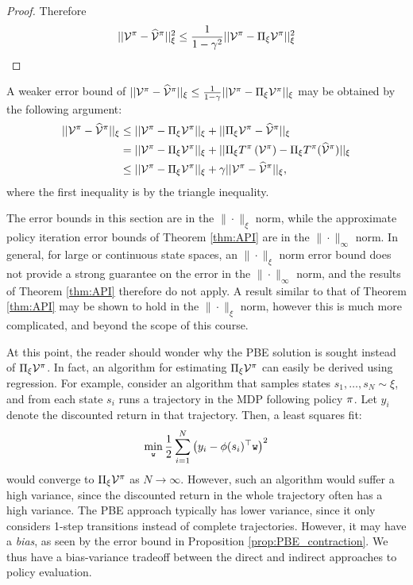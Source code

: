 \begin{proof}
Therefore
$$||\mathcal{V}^\pi - \widehat{\mathcal{V}}^{\pi}||_\xi^2 \le \frac{1}{1-\gamma^2}||\mathcal{V}^\pi-\Pi_\xi \mathcal{V}^\pi||_\xi^2$$
\end{proof}

\begin{remark}
A weaker error bound of $||\mathcal{V}^\pi - \widehat{\mathcal{V}}^{\pi}||_\xi \le \frac{1}{1-\gamma}||\mathcal{V}^\pi-\Pi_\xi
\mathcal{V}^\pi||_\xi$ may be obtained by the following argument:
\begin{equation}
\begin{split}||\mathcal{V}^{\pi}-\widehat{\mathcal{V}}^{\pi}||_{\xi} & \leq||\mathcal{V}^{\pi}-\Pi_{\xi}\mathcal{V}^{\pi}||_{\xi}+||\Pi_{\xi}\mathcal{V}^{\pi}-\widehat{\mathcal{V}}^{\pi}||_{\xi}\\
 & =||\mathcal{V}^{\pi}-\Pi_{\xi}\mathcal{V}^{\pi}||_{\xi}+||\Pi_{\xi}T^{\pi}\left(\mathcal{V}^{\pi}\right)-\Pi_{\xi}T^{\pi}(\widehat{\mathcal{V}}^{\pi})||_{\xi}\\
 & \leq||\mathcal{V}^{\pi}-\Pi_{\xi}\mathcal{V}^{\pi}||_{\xi}+\gamma||\mathcal{V}^{\pi}-\widehat{\mathcal{V}}^{\pi}||_{\xi},
\end{split}
\end{equation}
where the first inequality is by the triangle inequality.
\end{remark}
\begin{remark}
The error bounds in this section are in the $\| \cdot \|_\xi$ norm, while the approximate policy iteration error bounds of Theorem \ref{thm:API} are in the $\| \cdot \|_\infty$ norm. In general, for large or continuous state spaces, an $\| \cdot \|_\xi$ norm error bound does not provide a strong guarantee on the error in the $\| \cdot \|_\infty$ norm, and the results of Theorem \ref{thm:API} therefore do not apply. A result similar to that of Theorem \ref{thm:API} may be shown to hold in the $\| \cdot \|_\xi$ norm, however this is much more complicated, and beyond the scope of this course.
\end{remark}
\begin{remark}
At this point, the reader should wonder why the PBE solution is sought instead of  $\Pi_\xi \mathcal{V}^\pi$. In fact, an algorithm for estimating $\Pi_\xi \mathcal{V}^\pi$ can easily be derived using regression. For example, consider an algorithm that samples states $s_1,\dots,s_N \sim \xi$, and from each state $s_i$ runs a trajectory in the MDP following policy $\pi$. Let $y_i$ denote the discounted return in that trajectory. Then, a least squares fit:
\begin{equation*}
    \min_{\texttt{w}} \frac{1}{2}\sum_{i=1}^{N} \left(y_i - \phi(s_i)^\top\texttt{w}\right)^2
\end{equation*}
would converge to $\Pi_\xi \mathcal{V}^\pi$ as $N\to \infty$. However, such an algorithm would suffer a high variance, since the discounted return in the whole trajectory often has a high variance. The PBE approach typically has lower variance, since it only considers 1-step transitions instead of complete trajectories. However, it may have a \emph{bias}, as seen by the error bound in Proposition \ref{prop:PBE_contraction}. We thus have a bias-variance tradeoff between the direct and indirect approaches to policy evaluation.
\end{remark}
